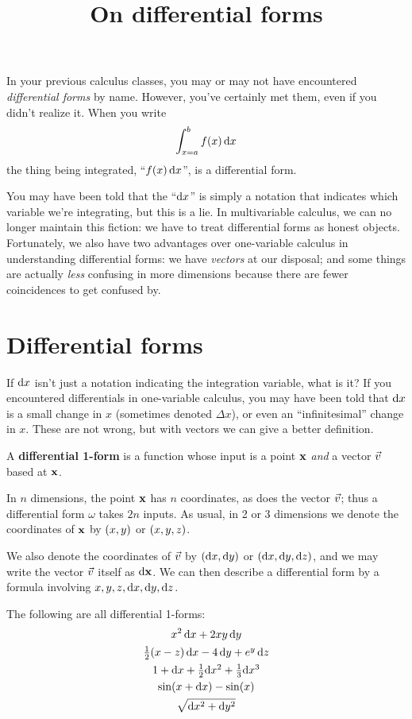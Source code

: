 \documentclass[12pt]{amsart}
\title{On differential forms}
\begin{document}
\maketitle

In your previous calculus classes, you may or may not have encountered \emph{differential forms} by name.
However, you've certainly met them, even if you didn't realize it.
When you write
\[ \int_{x=a}^b f(x) \,\mathrm{d} x \]
the thing being integrated, ``$f(x) \,\mathrm{d} x$'', is a differential form.

You may have been told that the ``$\mathrm{d} x$'' is simply a notation that indicates which variable we're integrating, but this is a lie.
In multivariable calculus, we can no longer maintain this fiction: we have to treat differential forms as honest objects.
Fortunately, we also have two advantages over one-variable calculus in understanding differential forms: we have \emph{vectors} at our disposal; and some things are actually \emph{less} confusing in more dimensions because there are fewer coincidences to get confused by.

\section{Differential forms}
\label{sec:differential-forms}

If $\mathrm{d} x$ isn't just a notation indicating the integration variable, what is it?
If you encountered differentials in one-variable calculus, you may have been told that $\mathrm{d} x$ is a small change in $x$ (sometimes denoted $\Delta x$), or even an ``infinitesimal'' change in $x$.
These are not wrong, but with vectors we can give a better definition.

\begin{defn}
  A \textbf{differential 1-form} is a function whose input is a point $\mathbf{x}$ \emph{and} a vector $\vec{v}$ based at $\mathbf{x}$.
\end{defn}

In $n$ dimensions, the point $\mathbf{x}$ has $n$ coordinates, as does the vector $\vec{v}$; thus a differential form $\omega$ takes $2n$ inputs.
As usual, in 2 or 3 dimensions we denote the coordinates of $\mathbf{x}$ by $(x,y)$ or $(x,y,z)$.

We also denote the coordinates of $\vec{v}$ by $(\mathrm{d} x,\mathrm{d} y)$ or $(\mathrm{d} x,\mathrm{d} y,\mathrm{d} z)$, and we may write the vector $\vec{v}$ itself as $\mathrm{d}\mathbf{x}$.
We can then describe a differential form by a formula involving $x,y,z,\mathrm{d} x,\mathrm{d} y,\mathrm{d} z$.

\begin{egs}
  The following are all differential 1-forms:
  \begin{gather*}
    x^2 \,\mathrm{d} x + 2xy \, \mathrm{d} y\\
    \textstyle\frac{1}{2}({x-z}) \,\mathrm{d} x - 4\, \mathrm{d} y + e^y \,\mathrm{d} z\\
    1 + \mathrm{d} x + \textstyle\frac{1}{2} \mathrm{d} x^2 + \textstyle\frac{1}{3} \mathrm{d} x^3\\
    \sin(x + \mathrm{d} x) - \sin(x)\\
    \sqrt{\mathrm{d} x^2+\mathrm{d} y^2}
  \end{gather*}
\end{egs}
\end{document}
